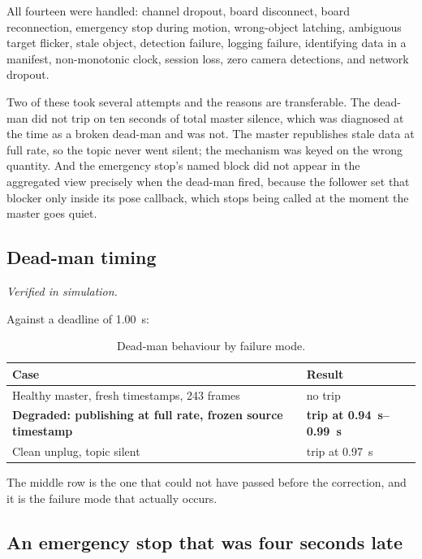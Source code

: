 All fourteen were handled: channel dropout, board disconnect, board
reconnection, emergency stop during motion, wrong-object latching, ambiguous
target flicker, stale object, detection failure, logging failure, identifying
data in a manifest, non-monotonic clock, session loss, zero camera detections,
and network dropout.

Two of these took several attempts and the reasons are transferable. The
dead-man did not trip on ten seconds of total master silence, which was
diagnosed at the time as a broken dead-man and was not. The master republishes
stale data at full rate, so the topic never went silent; the mechanism was
keyed on the wrong quantity. And the emergency stop's named block did not
appear in the aggregated view precisely when the dead-man fired, because the
follower set that blocker only inside its pose callback, which stops being
called at the moment the master goes quiet.

\subsection{Dead-man timing}

\emph{Verified in simulation.}

Against a deadline of \SI{1.00}{\second}:

\begin{table}[htbp]
  \centering
  \caption{Dead-man behaviour by failure mode.}
  \label{tab:deadman}
  \begin{tabular}{@{}ll@{}}
    \toprule
    Case & Result \\
    \midrule
    Healthy master, fresh timestamps, 243 frames & no trip \\
    \textbf{Degraded: publishing at full rate, frozen source timestamp}
      & \textbf{trip at \SIrange{0.94}{0.99}{\second}} \\
    Clean unplug, topic silent & trip at \SI{0.97}{\second} \\
    \bottomrule
  \end{tabular}
\end{table}

The middle row is the one that could not have passed before the correction,
and it is the failure mode that actually occurs.

\subsection{An emergency stop that was four seconds late}

